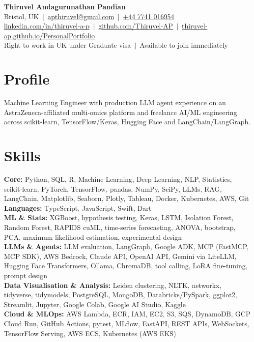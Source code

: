 \documentclass[a4paper,11pt]{article}
\begin{document}
\fontsize{11}{13.2}\selectfont

\begin{center}
  {\LARGE\bfseries Thiruvel Andagurunathan Pandian}\\[3pt]
  Bristol, UK \,$|$\, \href{mailto:apthiruvel@gmail.com}{apthiruvel@gmail.com} \,$|$\, \href{tel:+447741016954}{+44 7741 016954}\\[1pt]
\href{https://www.linkedin.com/in/thiruvel-a-p/}{linkedin.com/in/thiruvel-a-p} \,$|$\, \href{https://github.com/Thiruvel-AP}{github.com/Thiruvel-AP} \,$|$\, \href{https://thiruvel-ap.github.io/PersonalPortfolio/}{thiruvel-ap.github.io/PersonalPortfolio}\\[1pt]
  Right to work in UK under Graduate visa \,$|$\, Available to join immediately
\end{center}

\section{Profile}
Machine Learning Engineer with production LLM agent experience on an AstraZeneca-affiliated multi-omics platform and freelance AI/ML engineering across scikit-learn, TensorFlow/Keras, Hugging Face and LangChain/LangGraph.

\section{Skills}
\textbf{Core:} Python, SQL, R, Machine Learning, Deep Learning, NLP, Statistics, scikit-learn, PyTorch, TensorFlow, pandas, NumPy, SciPy, LLMs, RAG, LangChain, Matplotlib, Seaborn, Plotly, Tableau, Docker, Kubernetes, AWS, Git\\[2pt]
\textbf{Languages:} TypeScript, JavaScript, Swift, Dart\\[2pt]
\textbf{ML \& Stats:} XGBoost, hypothesis testing, Keras, LSTM, Isolation Forest, Random Forest, RAPIDS cuML, time-series forecasting, ANOVA, bootstrap, PCA, maximum likelihood estimation, experimental design\\[2pt]
\textbf{LLMs \& Agents:} LLM evaluation, LangGraph, Google ADK, MCP (FastMCP, MCP SDK), AWS Bedrock, Claude API, OpenAI API, Gemini via LiteLLM, Hugging Face Transformers, Ollama, ChromaDB, tool calling, LoRA fine-tuning, prompt design\\[2pt]
\textbf{Data Visualisation \& Analysis:} Leiden clustering, NLTK, networkx, tidyverse, tidymodels, PostgreSQL, MongoDB, Databricks/PySpark, ggplot2, Streamlit, Jupyter, Google Colab, Google AI Studio, Kaggle\\[2pt]
\textbf{Cloud \& MLOps:} AWS Lambda, ECR, IAM, EC2, S3, SQS, DynamoDB, GCP Cloud Run, GitHub Actions, pytest, MLflow, FastAPI, REST APIs, WebSockets, TensorFlow Serving, AWS ECS, Kubernetes (AWS EKS)
\end{document}
